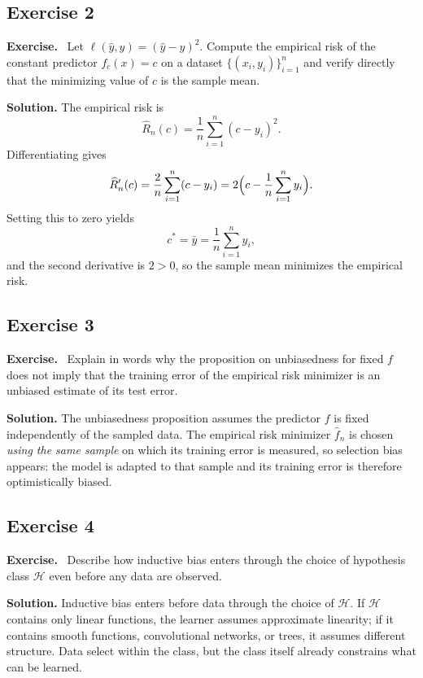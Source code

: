 \documentclass[11pt]{article}
\newenvironment{exercisebox}{\begin{framed}\noindent\textbf{Exercise.}\ }{\end{framed}}
\begin{document}
\subsection*{Exercise 2}
\begin{exercisebox}
Let $\ell(\hat y,y)=(\hat y-y)^2$. Compute the empirical risk of the constant predictor $f_c(x)=c$ on a dataset $\{(x_i,y_i)\}_{i=1}^n$ and verify directly that the minimizing value of $c$ is the sample mean.
\end{exercisebox}
\textbf{Solution.} The empirical risk is
\[
\widehat R_n(c)=\frac1n\sum_{i=1}^n(c-y_i)^2.
\]
Differentiating gives
\[
\widehat R_n'(c)=\frac2n\sum_{i=1}^n(c-y_i)=2\Bigl(c-\frac1n\sum_{i=1}^n y_i\Bigr).
\]
Setting this to zero yields
\[
c^*=\bar y=\frac1n\sum_{i=1}^n y_i,
\]
and the second derivative is $2>0$, so the sample mean minimizes the empirical risk.

\subsection*{Exercise 3}
\begin{exercisebox}
Explain in words why the proposition on unbiasedness for fixed $f$ does not imply that the training error of the empirical risk minimizer is an unbiased estimate of its test error.
\end{exercisebox}
\textbf{Solution.} The unbiasedness proposition assumes the predictor $f$ is fixed independently of the sampled data. The empirical risk minimizer $\hat f_n$ is chosen \emph{using the same sample} on which its training error is measured, so selection bias appears: the model is adapted to that sample and its training error is therefore optimistically biased.

\subsection*{Exercise 4}
\begin{exercisebox}
Describe how inductive bias enters through the choice of hypothesis class $\mathcal H$ even before any data are observed.
\end{exercisebox}
\textbf{Solution.} Inductive bias enters before data through the choice of $\mathcal H$. If $\mathcal H$ contains only linear functions, the learner assumes approximate linearity; if it contains smooth functions, convolutional networks, or trees, it assumes different structure. Data select within the class, but the class itself already constrains what can be learned.
\end{document}
